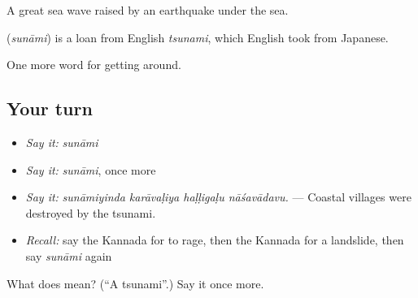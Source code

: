 A great sea wave raised by an earthquake under the sea.

\begin{cousinweb}
\textbf{} (\emph{sunāmi}) is a loan from English \emph{tsunami}, which English took from Japanese.
\end{cousinweb}

\begin{grammarlens}[title={What you've built}]
One more word for getting around.
\end{grammarlens}

\subsection*{Your turn}
\begin{itemize}
\raggedright
  \item \emph{Say it:} \emph{sunāmi}
  \item \emph{Say it:} \emph{sunāmi}, once more
  \item \emph{Say it:} \emph{sunāmiyinda karāvaḷiya haḷḷigaḷu nāśavādavu.} — Coastal villages were destroyed by the tsunami.
  \item \emph{Recall:} say the Kannada for to rage, then the Kannada for a landslide, then say \emph{sunāmi} again
\end{itemize}

\begin{tcolorbox}[breakable,colback=teal!4,colframe=teal!35!black,title={Before you move on}]
What does  mean? (\textquotedblleft{}A tsunami\textquotedblright{}.) Say it once more.
\end{tcolorbox}
